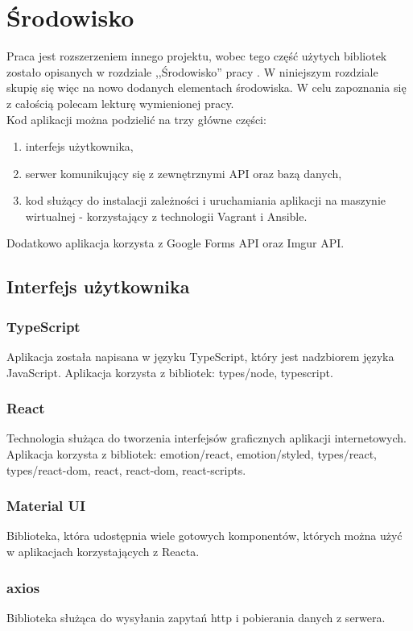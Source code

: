 \chapter{Środowisko}
Praca jest rozszerzeniem innego projektu, wobec tego część użytych bibliotek zostało opisanych 
w rozdziale ,,Środowisko'' pracy \ap. W niniejszym rozdziale skupię się więc na nowo dodanych
elementach środowiska. W celu zapoznania się z całością polecam lekturę wymienionej 
pracy.
\\ Kod aplikacji można podzielić na trzy główne części:
\begin{enumerate}
  \item interfejs użytkownika,
  \item serwer komunikujący się z zewnętrznymi API oraz bazą danych,
  \item kod służący do instalacji zależności i uruchamiania aplikacji na maszynie wirtualnej 
  - korzystający z technologii Vagrant i Ansible.
\end{enumerate}
Dodatkowo aplikacja korzysta z Google Forms API oraz Imgur API.

\section{Interfejs użytkownika}

\subsection{TypeScript}
Aplikacja została napisana w języku TypeScript, który jest nadzbiorem języka JavaScript. 
Aplikacja korzysta z bibliotek: 
types/node, typescript.

\subsection{React}
Technologia służąca do tworzenia interfejsów
graficznych aplikacji internetowych. Aplikacja korzysta z bibliotek:
emotion/react, emotion/styled, types/react, types/react-dom, 
react, react-dom, react-scripts.

\subsection{Material UI}
Biblioteka, która udostępnia wiele gotowych komponentów, których można użyć w
aplikacjach korzystających z Reacta. 

\subsection{axios}
Biblioteka służąca do wysyłania zapytań http i pobierania danych z serwera.

